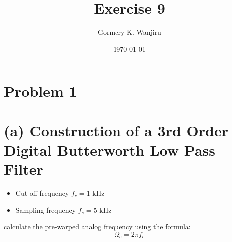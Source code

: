 \documentclass{article}
\title{Exercise 9}
\author{Gormery K. Wanjiru}
\date{\today}
\begin{document}
\maketitle

\section*{Problem 1}

\section*{(a) Construction of a 3rd Order Digital Butterworth Low Pass Filter}






\begin{itemize}
    \item Cut-off frequency $f_c = 1$ kHz
    \item Sampling frequency $f_s = 5$ kHz
\end{itemize}

calculate the pre-warped analog frequency using the formula:
\[
\Omega_{c} = 2 \pi f_{c}
\]
\end{document}
